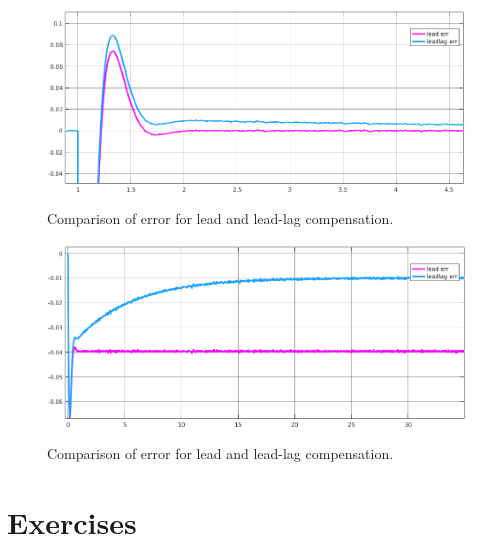 \documentclass[11pt,a4paper]{article}
\begin{document}
\begin{figure}[!htbp]
	\includegraphics[width=\textwidth]{imglab/lab4sol_trajleadvleadlag.png}
	\caption{Comparison of error for lead and lead-lag compensation.}
\end{figure}


\begin{figure}[!htbp]
	\includegraphics[width=\textwidth]{imglab/lab4sol_velerrleadvleadlag.png}
	\caption{Comparison of error for lead and lead-lag compensation.}
\end{figure}

\section{Exercises}
\end{document}
